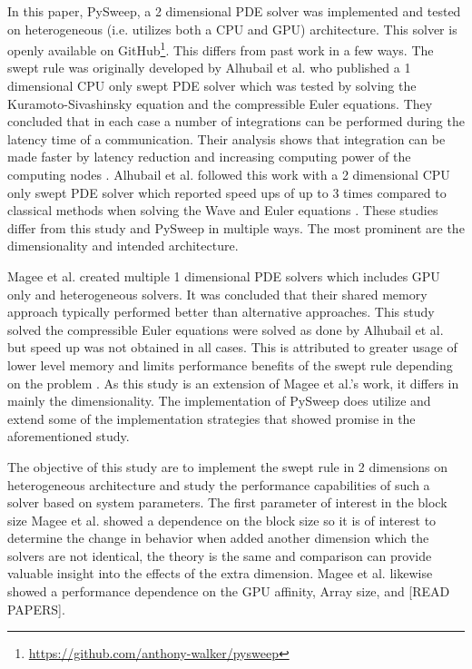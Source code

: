 \documentclass[review]{elsarticle}
\def\github{\url{https://github.com/anthony-walker/pysweep}}
\begin{document}
\par
In this paper, PySweep, a 2 dimensional PDE solver was implemented and tested on heterogeneous (i.e. utilizes both a CPU and GPU) architecture. This solver is openly available on GitHub\footnote{\github}. This differs from past work in a few ways. The swept rule was originally developed by Alhubail et al. who published a 1 dimensional CPU only swept PDE solver which was tested by solving the Kuramoto-Sivashinsky equation and the compressible Euler equations. They concluded that in each case a number of integrations can be performed during the latency time of a communication. Their analysis shows that integration can be made faster by latency reduction and increasing computing power of the computing nodes \cite{Alhubail2016ThePDEs}. Alhubail et al. followed this work with a 2 dimensional CPU only swept PDE solver which reported speed ups of up to 3 times compared to classical methods when solving the Wave and Euler equations \cite{Alhubail2018ThePDEs}. These studies differ from this study and PySweep in multiple ways. The most prominent are the dimensionality and intended architecture.
\par
Magee et al. created multiple 1 dimensional PDE solvers which includes GPU only and heterogeneous solvers. It was concluded that their shared memory approach typically performed better than alternative approaches. This study solved the compressible Euler equations were solved as done by Alhubail et al. \cite{Alhubail2016ThePDEs} but speed up was not obtained in all cases. This is attributed to greater usage of lower level memory and limits performance benefits of the swept rule depending on the problem \cite{Magee2018AcceleratingDecomposition}. As this study is an extension of Magee et al.'s work, it differs in mainly the dimensionality. The implementation of PySweep does utilize and extend some of the implementation strategies that showed promise in the aforementioned study.

\par
The objective of this study are to implement the swept rule in 2 dimensions on heterogeneous architecture and study the performance capabilities of such a solver based on system parameters. The first parameter of interest in the block size Magee et al. showed a dependence on the block size so it is of interest to determine the change in behavior when added another dimension which the solvers are not identical, the theory is the same and comparison can provide valuable insight into the effects of the extra dimension. Magee et al. likewise showed a performance dependence on the GPU affinity, Array size, and [READ PAPERS].
\end{document}
